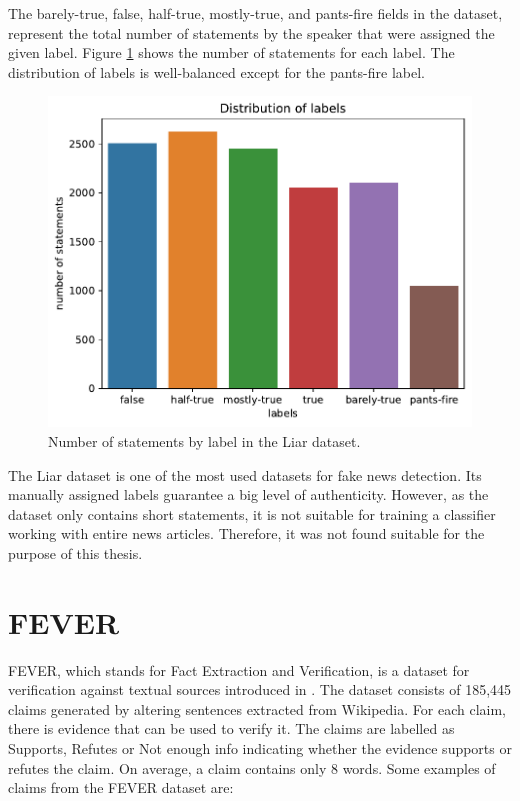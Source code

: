 The barely-true, false, half-true, mostly-true, and pants-fire fields in the dataset, represent the total number of statements by the speaker that were assigned the given label. Figure \ref{fig:liar_labels} shows the number of statements for each label. The distribution of labels is well-balanced except for the pants-fire label. 
\begin{figure}[h]
    \centering
    \includegraphics[scale=0.6]{obrazky-figures/liar_labels.pdf}
    \caption{Number of statements by label in the Liar dataset.}
    \label{fig:liar_labels}
\end{figure}

The Liar dataset is one of the most used datasets for fake news detection. Its manually assigned labels guarantee a big level of authenticity. However, as the dataset only contains short statements, it is not suitable for training a classifier working with entire news articles. Therefore, it was not found suitable for the purpose of this thesis.


\section{FEVER}
\label{datasets:fever}
FEVER, which stands for Fact Extraction and Verification, is a dataset for verification against textual sources introduced in \cite{fever}. The dataset consists of 185,445 claims generated by altering sentences extracted from Wikipedia. For each claim, there is evidence that can be used to verify it. The claims are labelled as Supports, Refutes or Not enough info indicating whether the evidence supports or refutes the claim. On average, a claim contains only 8 words. Some examples of claims from the FEVER dataset are:

